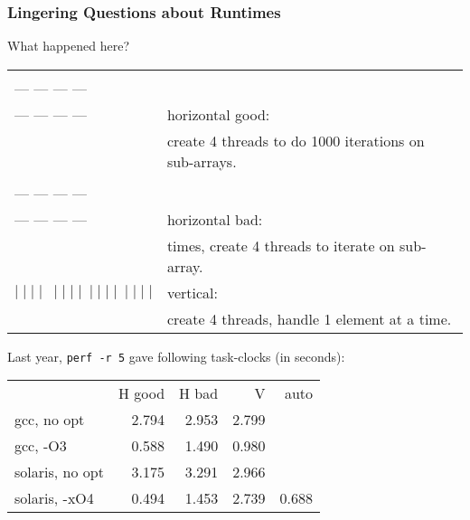 \documentclass[aspectratio=43]{beamer}
\newenvironment{changemargin}[1]{%
  \begin{list}{}{%
    \setlength{\topsep}{0pt}%
    \setlength{\leftmargin}{#1}%
    \setlength{\rightmargin}{1em}
    \setlength{\listparindent}{\parindent}%
    \setlength{\itemindent}{\parindent}%
    \setlength{\parsep}{\parskip}%
  }%
  \item[]}{\end{list}}
\begin{document}
\begin{frame}[containsverbatim]
  \frametitle{Lingering Questions about Runtimes}

  \begin{changemargin}{1.5cm}
    What happened here?\\[1em]
  \end{changemargin}
    \begin{tabular}{ll}
      \begin{minipage}{5em} --- --- --- ---\\[-.8em] --- --- --- ---\\[-.8em] --- --- --- --- \end{minipage}& horizontal good: \\
      & \qquad create 4 threads to do 1000 iterations on sub-arrays.\\
      \begin{minipage}{5em} --- --- --- ---\\[-.8em] --- --- --- ---\\[-.8em] --- --- --- --- \end{minipage}& horizontal bad: \\
      & \qquad 1000 times, create 4 threads to iterate on sub-array. \\
      $ \mid \mid \mid\mid \: \mid \mid \mid \mid \: \mid \mid \mid \mid\: \mid \mid \mid \mid$& vertical:\\
      & \qquad create 4 threads, handle 1 element at a time.\\[1em]
    \end{tabular}
    \begin{changemargin}{1.5cm}
      
      Last year, {\tt perf -r 5} gave following task-clocks (in seconds):\\[1em]

      \begin{center}
      \begin{tabular}{lrrrr}
        & H good & H bad & V & auto \\
        gcc, no opt & 2.794 & 2.953 & 2.799\\
        gcc, -O3 & 0.588 & 1.490 & 0.980\\
        solaris, no opt & 3.175 & 3.291 & 2.966 \\
        solaris, -xO4 & 0.494 & 1.453 & 2.739 & 0.688\\
      \end{tabular}
      \end{center}
  \end{changemargin}
\end{frame}
\end{document}
